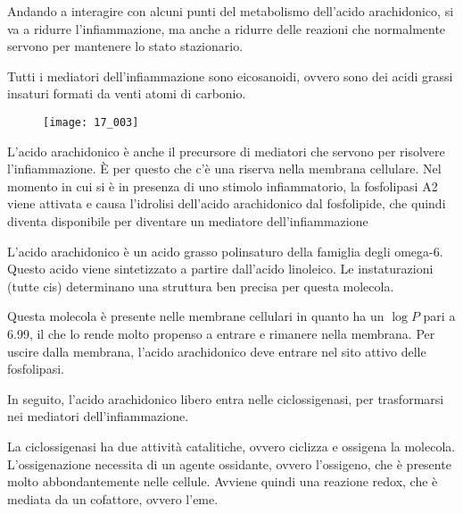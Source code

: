 
Andando a interagire con alcuni punti del metabolismo dell'acido
arachidonico, si va a ridurre l'infiammazione, ma anche a ridurre delle
reazioni che normalmente servono per mantenere lo stato stazionario.

Tutti i mediatori dell'infiammazione sono eicosanoidi, ovvero sono dei
acidi grassi insaturi formati da venti atomi di carbonio.

\begin{figure}[H]
    \centering
\texttt{[image: 17\_003]}
\end{figure}

L'acido arachidonico è anche il precursore di mediatori che servono per
risolvere l'infiammazione. È per questo che c'è una riserva nella
membrana
cellulare.
Nel momento in cui si è in presenza di uno stimolo infiammatorio, la
fosfolipasi A2 viene attivata e causa l'idrolisi dell'acido arachidonico
dal fosfolipide, che quindi diventa disponibile per diventare un
mediatore dell'infiammazione

L'acido arachidonico è un acido grasso polinsaturo della famiglia degli
omega-6. Questo acido viene sintetizzato a partire dall'acido linoleico.
Le instaturazioni (tutte cis) determinano una struttura ben precisa per
questa molecola.

Questa molecola è presente nelle membrane cellulari in quanto ha un
\(\log{} P\) pari a 6.99, il che lo rende molto propenso a entrare e
rimanere nella membrana. Per uscire dalla membrana, l'acido arachidonico
deve entrare nel sito attivo delle fosfolipasi.



In seguito, l'acido arachidonico libero entra nelle ciclossigenasi, per
trasformarsi nei mediatori dell'infiammazione.


La ciclossigenasi ha due attività catalitiche, ovvero ciclizza e
ossigena la molecola. L'ossigenazione necessita di un agente ossidante,
ovvero l'ossigeno, che è presente molto abbondantemente nelle cellule.
Avviene quindi una reazione redox, che è mediata da un cofattore,
ovvero l'eme.

